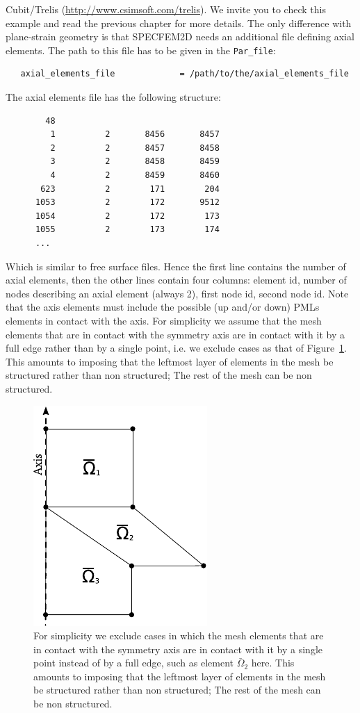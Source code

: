 Cubit/Trelis (\url{http://www.csimsoft.com/trelis}).
We invite you to check this example and read the previous chapter for more details. The only difference with plane-strain geometry is that SPECFEM2D needs an additional file defining
axial elements. The path to this file has to be given in the \texttt{Par\_file}:
\begin{verbatim}
   axial_elements_file             = /path/to/the/axial_elements_file
\end{verbatim}
The axial elements file has the following structure:
\begin{verbatim}
        48
         1          2       8456       8457
         2          2       8457       8458
         3          2       8458       8459
         4          2       8459       8460
       623          2        171        204
      1053          2        172       9512
      1054          2        172        173
      1055          2        173        174
      ...
\end{verbatim}
Which is similar to free surface files. Hence the first line contains the number of axial elements, then the other lines contain four columns:
element id, number of nodes describing an axial element (always 2), first node id, second node id.
Note that the axis elements must include the possible (up and/or down) PMLs elements in contact with the axis.
For simplicity we assume that the mesh elements that are in contact with the symmetry axis are in contact with it
by a full edge rather than by a single point, i.e. we exclude cases as that of Figure~\ref{fig:meshrestrictionontheaxis}.
This amounts to imposing that the leftmost layer of elements in the mesh be structured rather than non structured; The rest of the mesh can be non structured.
\begin{figure}
\centerline{\includegraphics[width=0.38\linewidth]{figures/meshrestrictionontheaxis-eps-converted-to.pdf}}
\caption{\label{fig:meshrestrictionontheaxis} For simplicity we exclude cases in which the mesh elements that are in contact with the symmetry axis
are in contact with it by a single point instead of by a full edge, such as element $\bar{\Omega}_2$ here.
This amounts to imposing that the leftmost layer of elements in the mesh be structured rather than non structured; The rest of the mesh can be non structured.}
\end{figure}
